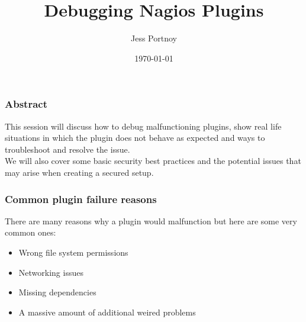 \documentclass[aspectratio=169]{beamer}
\title[Debugging Nagios Plugins| Nagios World Conference 2015]{Debugging Nagios Plugins} %
\author{Jess Portnoy} %
\institute[Kaltura, Inc] %
{
Kaltura, Inc \\ %
\medskip
\textit{jess.portnoy@kaltura.com} %
}
\date{\today} %
\begin{document}
\begin{frame}
\titlepage %
\end{frame}




\begin{frame}
\frametitle{Abstract}
This session will discuss how to debug malfunctioning plugins, show real life situations in which the plugin does not behave as expected and ways to troubleshoot and resolve the issue. \\
\bigskip
We will also cover some basic security best practices and the potential issues that may arise when creating a secured setup.
\end{frame}


\begin{frame}
\frametitle{Common plugin failure reasons}
There are many reasons why a plugin would malfunction but here are some very common ones:
\begin{itemize}
\item Wrong file system permissions
\item Networking issues
\item Missing dependencies
\item A massive amount of additional weired problems
\end{itemize}
\end{frame}
\end{document}
